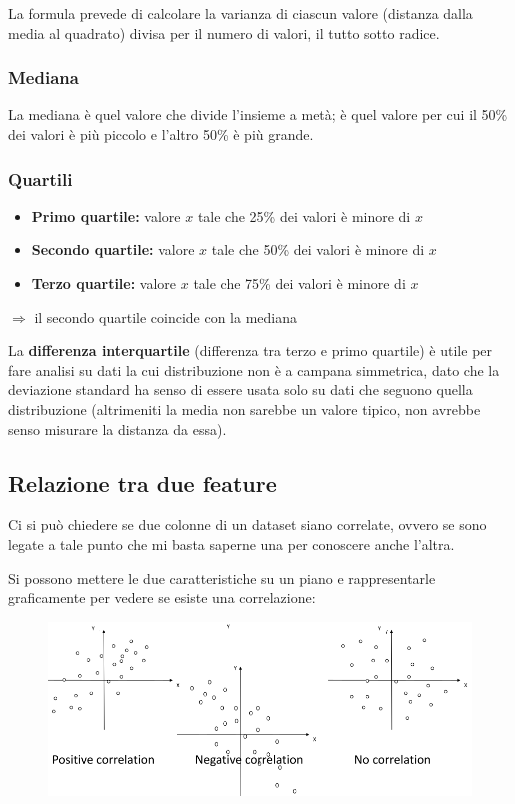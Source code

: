 \documentclass{report}
\begin{document}
\noindent La formula prevede di calcolare la varianza di ciascun valore (distanza dalla media al quadrato) divisa per il numero di valori, il tutto 
sotto radice.

\subsubsection{Mediana}

La mediana è quel valore che divide l'insieme a metà; è quel valore per cui il 50\% dei valori è più piccolo e l'altro 50\% è più grande.

\subsubsection{Quartili}
\begin{itemize}
    \item \textbf{Primo quartile:} valore $x$ tale che 25\% dei valori è minore di $x$
    \item \textbf{Secondo quartile:} valore $x$ tale che 50\% dei valori è minore di $x$
    \item \textbf{Terzo quartile:} valore $x$ tale che 75\% dei valori è minore di $x$
\end{itemize}

$\Rightarrow$ il secondo quartile coincide con la mediana 

\noindent La \textbf{differenza interquartile} (differenza tra terzo e primo quartile) è utile per fare analisi su dati la cui distribuzione non è 
a campana simmetrica, dato che la deviazione standard ha senso di essere usata solo su dati che seguono quella distribuzione (altrimeniti la 
media non sarebbe un valore tipico, non avrebbe senso misurare la distanza da essa).

\subsection{Relazione tra due feature}

Ci si può chiedere se due colonne di un dataset siano correlate, ovvero se sono legate a tale punto che mi basta saperne una per conoscere anche l'altra.

\noindent Si possono mettere le due caratteristiche su un piano e rappresentarle graficamente per vedere se esiste una correlazione:

\begin{figure}[H]
    \centering
    \includegraphics[width=1\linewidth]{images/correlazione.png}
\end{figure}
\end{document}
